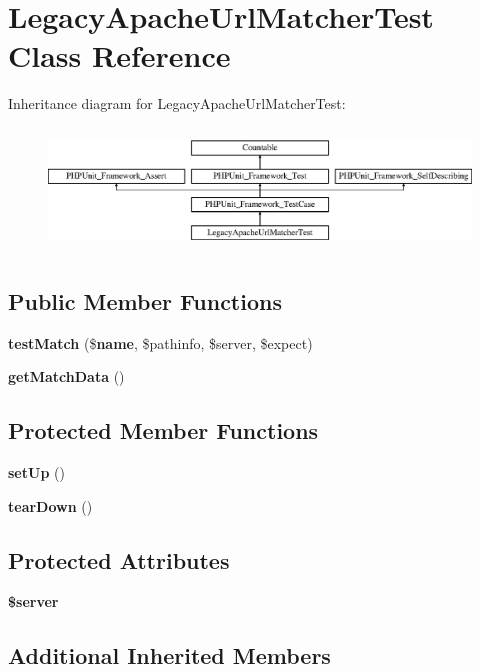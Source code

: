 \section{Legacy\+Apache\+Url\+Matcher\+Test Class Reference}
\label{class_symfony_1_1_component_1_1_routing_1_1_tests_1_1_matcher_1_1_legacy_apache_url_matcher_test}
Inheritance diagram for Legacy\+Apache\+Url\+Matcher\+Test\+:\begin{figure}[H]
\begin{center}
\leavevmode
\includegraphics[height=3.303835cm]{class_symfony_1_1_component_1_1_routing_1_1_tests_1_1_matcher_1_1_legacy_apache_url_matcher_test}
\end{center}
\end{figure}
\subsection*{Public Member Functions}
\begin{DoxyCompactItemize}
\item 
{\bf test\+Match} (\${\bf name}, \$pathinfo, \$server, \$expect)
\item 
{\bf get\+Match\+Data} ()
\end{DoxyCompactItemize}
\subsection*{Protected Member Functions}
\begin{DoxyCompactItemize}
\item 
{\bf set\+Up} ()
\item 
{\bf tear\+Down} ()
\end{DoxyCompactItemize}
\subsection*{Protected Attributes}
\begin{DoxyCompactItemize}
\item 
{\bf \$server}
\end{DoxyCompactItemize}
\subsection*{Additional Inherited Members}


